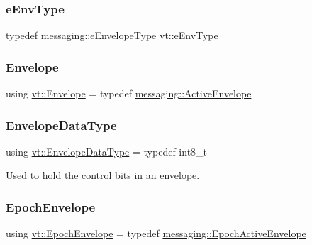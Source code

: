 \mbox{\label{namespacevt_abdfe9ac50e3799705ee21853c1509bf6}} 
\subsubsection{\texorpdfstring{e\+Env\+Type}{eEnvType}}
{\footnotesize\ttfamily typedef \hyperlink{namespacevt_1_1messaging_a6508ef3a4701a2e6fd0bfe3edcc63a6c}{messaging\+::e\+Envelope\+Type} \hyperlink{namespacevt_1_1messaging_a6508ef3a4701a2e6fd0bfe3edcc63a6c}{vt\+::e\+Env\+Type}}

\mbox{\label{namespacevt_aa9c8cc094b5361482021d63012987814}} 
\subsubsection{\texorpdfstring{Envelope}{Envelope}}
{\footnotesize\ttfamily using \hyperlink{namespacevt_aa9c8cc094b5361482021d63012987814}{vt\+::\+Envelope} = typedef \hyperlink{structvt_1_1messaging_1_1_active_envelope}{messaging\+::\+Active\+Envelope}}

\mbox{\label{namespacevt_a2740126d59f361d9ba46f66b3b4b0d3d}} 
\subsubsection{\texorpdfstring{Envelope\+Data\+Type}{EnvelopeDataType}}
{\footnotesize\ttfamily using \hyperlink{namespacevt_a2740126d59f361d9ba46f66b3b4b0d3d}{vt\+::\+Envelope\+Data\+Type} = typedef int8\+\_\+t}



Used to hold the control bits in an envelope. 

\mbox{\label{namespacevt_af71a025689a3da5037785b53a7a8e78c}} 
\subsubsection{\texorpdfstring{Epoch\+Envelope}{EpochEnvelope}}
{\footnotesize\ttfamily using \hyperlink{namespacevt_af71a025689a3da5037785b53a7a8e78c}{vt\+::\+Epoch\+Envelope} = typedef \hyperlink{structvt_1_1messaging_1_1_epoch_active_envelope}{messaging\+::\+Epoch\+Active\+Envelope}}


